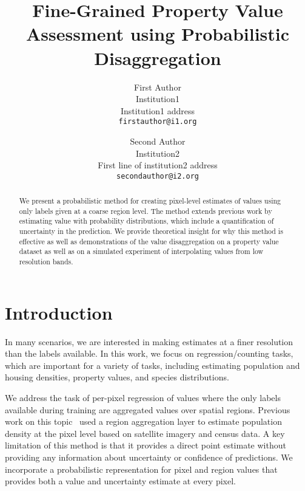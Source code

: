 \documentclass[10pt,twocolumn,letterpaper]{article}
\begin{document}
\title{Fine-Grained Property Value Assessment using Probabilistic Disaggregation}


\author{First Author\\
Institution1\\
Institution1 address\\
{\tt\small firstauthor@i1.org}
\and
Second Author\\
Institution2\\
First line of institution2 address\\
{\tt\small secondauthor@i2.org}
}

\maketitle

\begin{abstract}

We present a probabilistic method for creating pixel-level estimates of values using only labels given at a coarse region level. The method extends previous work by estimating value with probability distributions, which include a quantification of uncertainty in the prediction. We provide theoretical insight for why this method is effective as well as demonstrations of the value disaggregation on a property value dataset as well as on a simulated experiment of interpolating values from low resolution bands.

\end{abstract}

\section{Introduction}

In many scenarios, we are interested in making estimates at a finer resolution than the labels available. In this work, we focus on regression/counting tasks, which are important for a variety of tasks, including estimating population and housing densities, property values, and species distributions.

We address the task of per-pixel regression of values where the only labels available during training are aggregated values over spatial regions. Previous work on this topic~\cite{jacobs2018weakly} used a region aggregation layer to estimate population density at the pixel level based on satellite imagery and census data. A key limitation of this method is that it provides a direct point estimate without providing any information about uncertainty or confidence of predictions. We incorporate a probabilistic representation for pixel and region values that provides both a value and uncertainty estimate at every pixel. 
\end{document}
